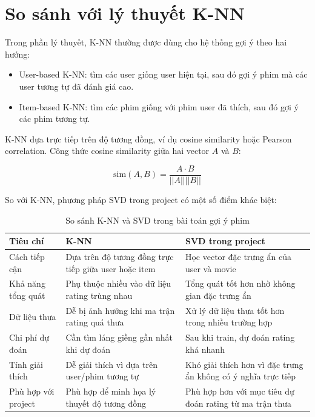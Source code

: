\documentclass[12pt,a4paper]{article}
\begin{document}
\section{So sánh với lý thuyết K-NN}

Trong phần lý thuyết, K-NN thường được dùng cho hệ thống gợi ý theo hai hướng:

\begin{itemize}
    \item User-based K-NN: tìm các user giống user hiện tại, sau đó gợi ý phim mà các user tương tự đã đánh giá cao.
    \item Item-based K-NN: tìm các phim giống với phim user đã thích, sau đó gợi ý các phim tương tự.
\end{itemize}

K-NN dựa trực tiếp trên độ tương đồng, ví dụ cosine similarity hoặc Pearson correlation. Công thức cosine similarity giữa hai vector \(A\) và \(B\):

\[
\text{sim}(A, B) = \frac{A \cdot B}{||A|| ||B||}
\]

So với K-NN, phương pháp SVD trong project có một số điểm khác biệt:

\begin{table}[H]
    \centering
    \begin{tabular}{p{4cm}p{5cm}p{5cm}}
        \toprule
        \textbf{Tiêu chí} & \textbf{K-NN} & \textbf{SVD trong project} \\
        \midrule
        Cách tiếp cận & Dựa trên độ tương đồng trực tiếp giữa user hoặc item & Học vector đặc trưng ẩn của user và movie \\
        Khả năng tổng quát & Phụ thuộc nhiều vào dữ liệu rating trùng nhau & Tổng quát tốt hơn nhờ không gian đặc trưng ẩn \\
        Dữ liệu thưa & Dễ bị ảnh hưởng khi ma trận rating quá thưa & Xử lý dữ liệu thưa tốt hơn trong nhiều trường hợp \\
        Chi phí dự đoán & Cần tìm láng giềng gần nhất khi dự đoán & Sau khi train, dự đoán rating khá nhanh \\
        Tính giải thích & Dễ giải thích vì dựa trên user/phim tương tự & Khó giải thích hơn vì đặc trưng ẩn không có ý nghĩa trực tiếp \\
        Phù hợp với project & Phù hợp để minh họa lý thuyết độ tương đồng & Phù hợp hơn với mục tiêu dự đoán rating từ ma trận thưa \\
        \bottomrule
    \end{tabular}
    \caption{So sánh K-NN và SVD trong bài toán gợi ý phim}
\end{table}
\end{document}
